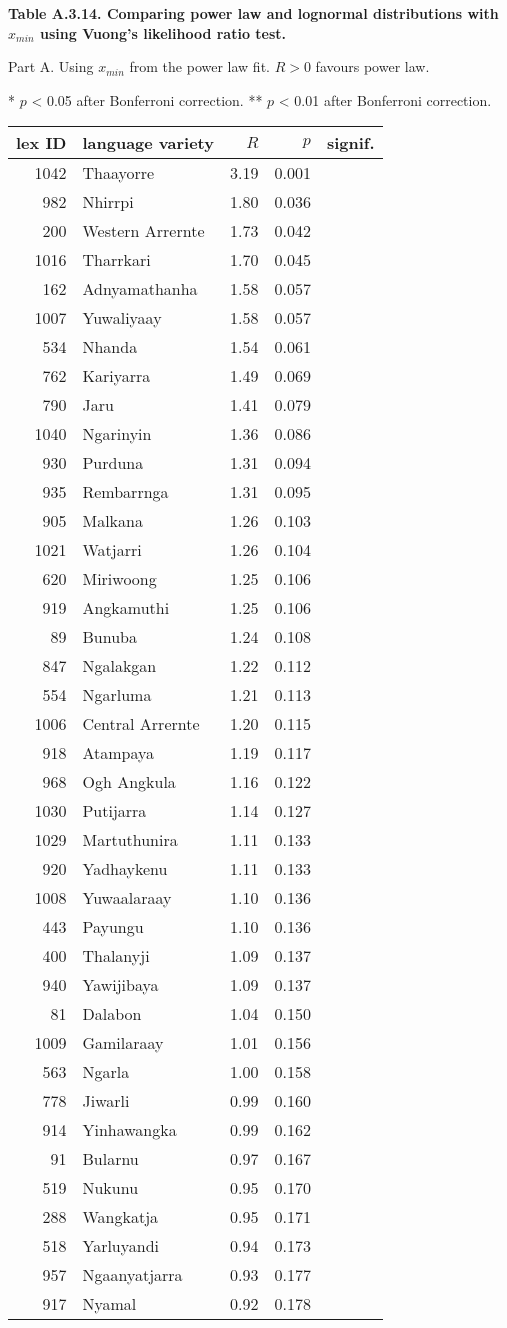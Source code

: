 \newpage

\textbf{Table A.3.14. Comparing power law and lognormal distributions
with \(x_{min}\) using Vuong's likelihood ratio test.}

Part A. Using \(x_{min}\) from the power law fit. \(R > 0\) favours
power law.

* \(p\) \textless{} 0.05 after Bonferroni correction. ** \(p\)
\textless{} 0.01 after Bonferroni correction.

\begin{longtable}[]{@{}rlrrl@{}}
\toprule
\textbf{lex ID} & \textbf{language variety} & \(R\) & \(p\) &
\textbf{signif.}\tabularnewline
\midrule
\endhead
1042 & Thaayorre & 3.19 & 0.001 &\tabularnewline
982 & Nhirrpi & 1.80 & 0.036 &\tabularnewline
200 & Western Arrernte & 1.73 & 0.042 &\tabularnewline
1016 & Tharrkari & 1.70 & 0.045 &\tabularnewline
162 & Adnyamathanha & 1.58 & 0.057 &\tabularnewline
1007 & Yuwaliyaay & 1.58 & 0.057 &\tabularnewline
534 & Nhanda & 1.54 & 0.061 &\tabularnewline
762 & Kariyarra & 1.49 & 0.069 &\tabularnewline
790 & Jaru & 1.41 & 0.079 &\tabularnewline
1040 & Ngarinyin & 1.36 & 0.086 &\tabularnewline
930 & Purduna & 1.31 & 0.094 &\tabularnewline
935 & Rembarrnga & 1.31 & 0.095 &\tabularnewline
905 & Malkana & 1.26 & 0.103 &\tabularnewline
1021 & Watjarri & 1.26 & 0.104 &\tabularnewline
620 & Miriwoong & 1.25 & 0.106 &\tabularnewline
919 & Angkamuthi & 1.25 & 0.106 &\tabularnewline
89 & Bunuba & 1.24 & 0.108 &\tabularnewline
847 & Ngalakgan & 1.22 & 0.112 &\tabularnewline
554 & Ngarluma & 1.21 & 0.113 &\tabularnewline
1006 & Central Arrernte & 1.20 & 0.115 &\tabularnewline
918 & Atampaya & 1.19 & 0.117 &\tabularnewline
968 & Ogh Angkula & 1.16 & 0.122 &\tabularnewline
1030 & Putijarra & 1.14 & 0.127 &\tabularnewline
1029 & Martuthunira & 1.11 & 0.133 &\tabularnewline
920 & Yadhaykenu & 1.11 & 0.133 &\tabularnewline
1008 & Yuwaalaraay & 1.10 & 0.136 &\tabularnewline
443 & Payungu & 1.10 & 0.136 &\tabularnewline
400 & Thalanyji & 1.09 & 0.137 &\tabularnewline
940 & Yawijibaya & 1.09 & 0.137 &\tabularnewline
81 & Dalabon & 1.04 & 0.150 &\tabularnewline
1009 & Gamilaraay & 1.01 & 0.156 &\tabularnewline
563 & Ngarla & 1.00 & 0.158 &\tabularnewline
778 & Jiwarli & 0.99 & 0.160 &\tabularnewline
914 & Yinhawangka & 0.99 & 0.162 &\tabularnewline
91 & Bularnu & 0.97 & 0.167 &\tabularnewline
519 & Nukunu & 0.95 & 0.170 &\tabularnewline
288 & Wangkatja & 0.95 & 0.171 &\tabularnewline
518 & Yarluyandi & 0.94 & 0.173 &\tabularnewline
957 & Ngaanyatjarra & 0.93 & 0.177 &\tabularnewline
917 & Nyamal & 0.92 & 0.178 &\tabularnewline

\end{longtable}
